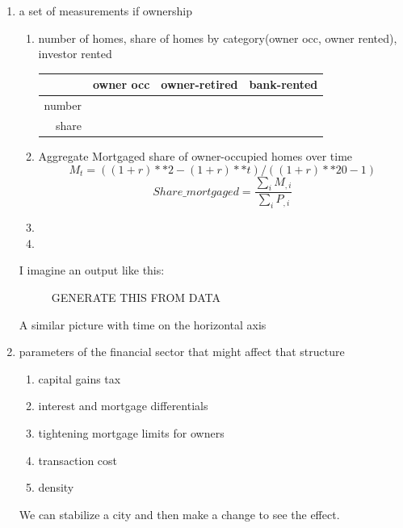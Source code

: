 \begin{enumerate}
    \item a set of measurements if ownership

        \begin{enumerate}
        \item number of homes, share of homes by category(owner occ, owner rented), 
        investor rented
        
\begin{tabular}{|r|c|c|c|}\hline
            & owner occ& owner-retired & bank-rented\\ \hline
number      & && \\ \hline
share       & && \\\hline
\end{tabular}

        \item Aggregate Mortgaged share of owner-occupied homes over time 
\[M_t=((1+r)**2-(1+r)**t) / ((1+r)**20-1)\]
\[Share\_mortgaged =\frac{\sum_i M_{,i}}{\sum_iP_{,i}}\]
        \item
        \item
        \end{enumerate} 


I imagine an output like this:

\begin{figure}
\centering
{}
\caption{GENERATE THIS FROM DATA}
\label{fig:enter-label}
\end{figure}


A similar picture with time on the horizontal axis

    \item parameters of the financial sector  that might affect that structure
    \begin{enumerate}
        \item capital gains tax
        \item interest and mortgage differentials
        \item tightening mortgage limits for owners
        \item transaction cost
        \item density
        
    \end{enumerate}

We can stabilize a city and then make a change to see the effect.

    
\end{enumerate}
